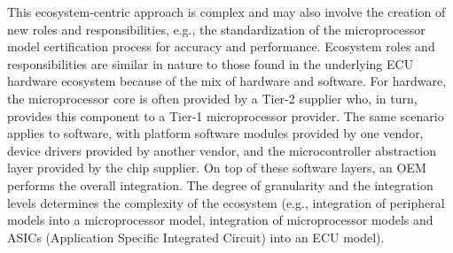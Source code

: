 This ecosystem-centric approach is complex and may also involve the creation of new roles and responsibilities, e.g., the standardization of the microprocessor model certification process for accuracy and performance.
Ecosystem roles and responsibilities are similar in nature to those found in the underlying ECU hardware ecosystem because of the mix of hardware and software.
For hardware, the microprocessor core is often provided by a Tier-2 supplier who, in turn, provides this component to a Tier-1 microprocessor provider.
The same scenario applies to software, with platform software modules provided by one vendor, device drivers provided by another vendor, and the microcontroller abstraction layer provided by the chip supplier.
On top of these software layers, an OEM performs the overall integration.
%
The degree of granularity and the integration levels determines the complexity of the ecosystem (e.g., integration of peripheral models into a microprocessor model, integration of microprocessor models and ASICs (Application Specific Integrated Circuit) into an ECU model).




